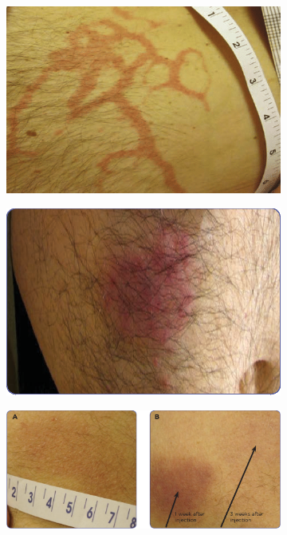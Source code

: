 \begin{figure}[H]
    \begin{center}
    \begin{subfigure}[b]{0.4\textwidth}
            \includegraphics[width=\linewidth]{img/Atypical-reaction.png}
            
            
    \end{subfigure}
    \begin{subfigure}[b]{0.4\textwidth}
        \includegraphics[width=\linewidth]{img/bortreaction.png}
        
      
        \end{subfigure}
        \begin{subfigure}[b]{0.7\textwidth}
            \includegraphics[width=\linewidth]{img/bortezomibreaction.png}
    

\end{subfigure}
\end{center}
\end{figure}
